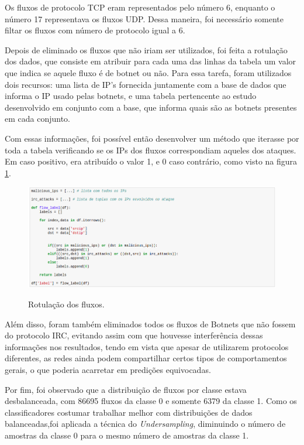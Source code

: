 Os fluxos de protocolo TCP eram representados pelo número 6, enquanto o número 17 representava os fluxos UDP. Dessa maneira, foi necessário somente filtar os fluxos com número de protocolo igual a 6.

Depois de eliminado os fluxos que não iriam ser utilizados, foi feita a rotulação dos dados, que consiste em atribuir para cada uma das linhas da tabela um valor que indica se aquele fluxo é de botnet ou não. Para essa tarefa, foram utilizados dois recursos: uma lista de IP's fornecida juntamente com a base de dados que informa o IP usado pelas botnets, e uma tabela pertencente ao estudo desenvolvido em conjunto com a base, que informa quais são as botnets presentes em cada conjunto.

Com essas informações, foi possível então desenvolver um método que iterasse por toda a tabela verificando se os IPs dos fluxos correspondiam aqueles dos ataques. Em caso positivo, era atribuído o valor 1, e 0 caso contrário, como visto na figura \ref{f.rotulacao-dados}.

\begin{figure}[h]
\caption{\small Rotulação dos fluxos.}
\centering
\includegraphics[scale=0.40]{figs/rotulacao-dados.png}
\label{f.rotulacao-dados}
\end{figure}

Além disso, foram também eliminados todos os fluxos de Botnets que não fossem do protocolo IRC, evitando assim com que houvesse interferência dessas informações nos resultados, tendo em vista que apesar de utilizarem protocolos diferentes, as redes ainda podem compartilhar certos tipos de comportamentos gerais, o que poderia acarretar em predições equivocadas.

Por fim, foi observado que a distribuição de fluxos por classe estava desbalanceada, com 86695 fluxos da classe 0 e somente 6379 da classe 1. Como os classificadores costumar trabalhar melhor com distribuições de dados balanceadas,foi aplicada a técnica do \textit{Undersampling}, diminuindo o número de amostras da classe 0 para o mesmo número de amostras da classe 1.

